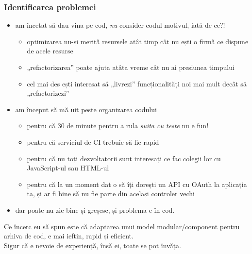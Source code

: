 \documentclass[compress]{beamer}
\begin{document}
\begin{frame}
\frametitle{Identificarea problemei}

\begin{itemize}[<+->]
  \item am încetat să dau vina pe cod, \emph{nu} consider codul motivul, iată de ce?!
    \begin{itemize}
      \item optimizarea nu-și merită resursele atât timp cât nu ești o firmă ce dispune de acele resurse
      \item „refactorizarea” poate ajuta atâta vreme cât nu ai presiunea timpului
      \item cel mai des ești interesat să „livrezi” funcționalități noi mai mult decât să „refactorizezi”
    \end{itemize}
  \item am început să mă uit peste organizarea codului
    \begin{itemize}
      \item pentru că 30 de minute pentru a rula \emph{suita cu teste} nu e fun!
      \item pentru că serviciul de CI trebuie să fie rapid
      \item pentru că nu toți dezvoltatorii sunt interesați ce fac colegii lor cu JavaScript-ul sau HTML-ul
      \item pentru că la un moment dat o să îți dorești un API cu OAuth la aplicația ta, și ar fi bine să nu fie parte din același controler vechi
    \end{itemize}
  \item dar poate nu zic bine și greșesc, și problema e în cod.
\end{itemize}
\end{frame}

\begin{frame}
  \begin{center}
    \huge Ce încerc eu să spun este că adaptarea unui model modular/component pentru arhiva de cod, e mai ieftin, rapid și eficient.
    \\
    \small Sigur că e nevoie de experiență, însă ei, toate se pot învăța.
  \end{center}
\end{frame}
\end{document}
